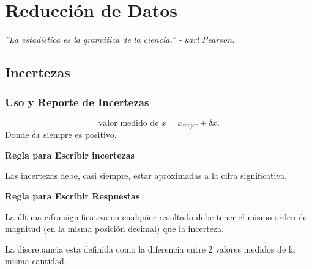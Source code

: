 \part{Reducción de Datos}

\vspace*{\fill}

\begin{center}
	\textit{''La estadística es la gramática de la ciencia.'' - karl Pearson.}
\end{center}

\vspace*{\fill}



\chapter{Incertezas}
\section{Uso y Reporte de Incertezas}
\begin{equation}
	\boxed{ \text{valor medido de } x = x_{\text{mejor}} \pm \delta x .}
\end{equation}
Donde $\delta x$ siempre es positivo.

\begin{tcolorbox}
	\begin{center}
		\textbf{Regla para Escribir incertezas}
	\end{center}
	Las incertezas debe, casi siempre, estar aproximadas a la cifra significativa.
\end{tcolorbox}


\begin{tcolorbox}
	\begin{center}
		\textbf{Regla para Escribir Respuestas}
	\end{center}
	La última cifra significativa en cualquier resultado debe tener el mismo orden de magnitud (en la misma posición decimal) que la incerteza.
\end{tcolorbox}

\begin{definition}
	La discrepancia esta definida como la diferencia entre 2 valores medidos de la misma cantidad.
\end{definition}

